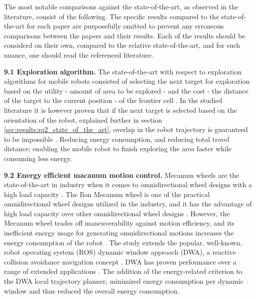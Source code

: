 \vspace{2mm}

\noindent 
The most notable comparisons against the state-of-the-art, as observed in the literature, consist of the following.
The specific results compared to the state-of-the-art for each paper are 
purposefully omitted to prevent any erroneous comparisons between the papers and their results.
Each of the results should be considerd on their own, 
compared to the relative state-of-the-art, and for such nuance, 
one should read the referenced literature.

\vspace{2mm} \noindent \textbf{9.1 Exploration algorithm.}
The state-of-the-art with respect to exploration algorithms for mobile robots
consisted of selecting the next target for exploration based on the utility - amount of area to be explored - 
and the cost - the distance of the target to the current position - of the frontier cell 
\cite{burgard2005multi_robot_exploration, simmons2000multi_robot_exploration,zlot2002multi_robot_exploration}.
In the studied literature it is however proven that if the next target is selected based on the orientation of the robot,
explained further in section \ref{sec:results:rq2_state_of_the_art},
overlap in the robot trajectory is guaranteed to be impossible \cite{mei2006mobile_exploration}.
Reducing energy consumption, and reducing total travel distance; enabling the mobile robot 
to finish exploring the area faster while consuming less energy. 

\vspace{2mm} \noindent \textbf{9.2 Energy efficient macanum motion control.}
Mecanum wheels are the state-of-the-art in industry when it comes to omnidirectional wheel designs with a high load capacity \cite{xie2018mecanum_wheel}.
The Ilon Mecanum wheel is one of the practical omnidirectional wheel designs utilized in the industry, 
and it has the advantage of high load capacity over other omnidirectional wheel designs \cite{adascalitei2011mecanum_wheels}.
However, the Mecanum wheel trades off maneuverability against motion efficiency, and its inefficient energy usage for generating omnidirectional 
motions increases the energy consumption of the robot \cite{diegel2002improved_mecanum_wheel}.
The study extends the popular, well-known, robot operating system (ROS) dynamic window approach (DWA),
a reactive collision avoidance navigation concept \cite{fox1997dwa_paper}.
DWA has proven performance over a range of extended applications \cite{brock1999dwa_usage_1,ogren2005dwa_usage_2,kiss2012dwa_usage_3}.
The addition of the energy-related criterion to the DWA local trajectory planner,
minimized energy consumption per dynamic window and thus reduced the overall energy consumption.

